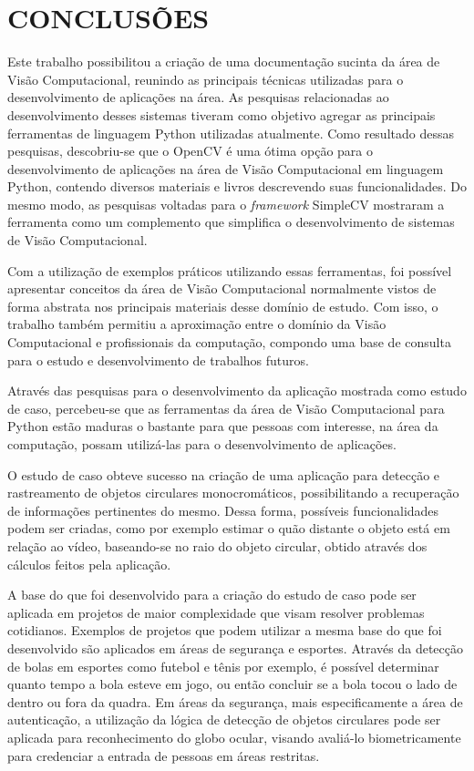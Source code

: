 \chapter{CONCLUSÕES}

Este trabalho possibilitou a criação de uma documentação sucinta da área de Visão Computacional, reunindo as principais técnicas utilizadas para o desenvolvimento de aplicações na área. As pesquisas relacionadas ao desenvolvimento desses sistemas tiveram como objetivo agregar as principais ferramentas de linguagem Python utilizadas atualmente. Como resultado dessas pesquisas, descobriu-se que o OpenCV é uma ótima opção para o desenvolvimento de aplicações na área de Visão Computacional em linguagem Python, contendo diversos materiais e livros descrevendo suas funcionalidades. Do mesmo modo, as pesquisas voltadas para o \textit{framework} SimpleCV mostraram a ferramenta como um complemento que simplifica o desenvolvimento de sistemas de Visão Computacional.

Com a utilização de exemplos práticos utilizando essas ferramentas, foi possível apresentar conceitos da área de Visão Computacional normalmente vistos de forma abstrata nos principais materiais desse domínio de estudo. Com isso, o trabalho também permitiu a aproximação entre o domínio da Visão Computacional e profissionais da computação, compondo uma base de consulta para o estudo e desenvolvimento de trabalhos futuros.

Através das pesquisas para o desenvolvimento da aplicação mostrada como estudo de caso, percebeu-se que as ferramentas da área de Visão Computacional para Python estão maduras o bastante para que pessoas com interesse, na área da computação, possam utilizá-las para o desenvolvimento de aplicações.

O estudo de caso obteve sucesso na criação de uma aplicação para detecção e rastreamento de objetos circulares monocromáticos, possibilitando a recuperação de informações pertinentes do mesmo. Dessa forma, possíveis funcionalidades podem ser criadas, como por exemplo estimar o quão distante o objeto está em relação ao vídeo, baseando-se no raio do objeto circular, obtido através dos cálculos feitos pela aplicação.

A base do que foi desenvolvido para a criação do estudo de caso pode ser aplicada em projetos de maior complexidade que visam resolver problemas cotidianos. Exemplos de projetos que podem utilizar a mesma base do que foi desenvolvido são aplicados em áreas de segurança e esportes. Através da detecção de bolas em esportes como futebol e tênis por exemplo, é possível determinar quanto tempo a bola esteve em jogo, ou então concluir se a bola tocou o lado de dentro ou fora da quadra. Em áreas da segurança, mais especificamente a área de autenticação, a utilização da lógica de detecção de objetos circulares pode ser aplicada para reconhecimento do globo ocular, visando avaliá-lo biometricamente para credenciar a entrada de pessoas em áreas restritas.

